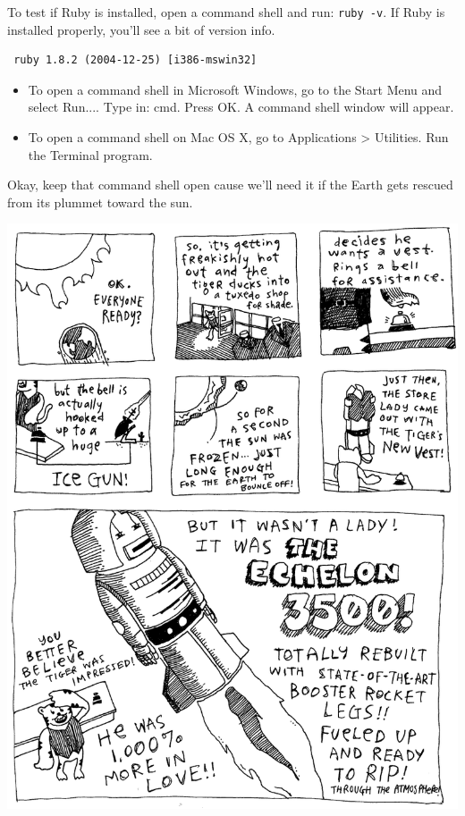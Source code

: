 \documentclass[10pt,twoside]{report}
\begin{document}
  To test if Ruby is installed, open a command shell and
run: \lstinline[breaklines=false]|ruby -v|. If Ruby is installed
properly, you'll see a bit of version info.

\begin{lstlisting}
 ruby 1.8.2 (2004-12-25) [i386-mswin32]
\end{lstlisting}

\begin{itemize}

\item To open a command shell in Microsoft Windows, go to the Start Menu
and select Run.... Type in: cmd. Press OK. A command shell window will
appear.

\item To open a command shell on Mac OS X, go to Applications >
Utilities. Run the Terminal program.

\end{itemize}

Okay, keep that command shell open cause we'll need it if the Earth
gets rescued from its plummet toward the sun.

\newpage
\includegraphics[width=1.0\textwidth]{cache/tigersvest2.png}
\end{document}

